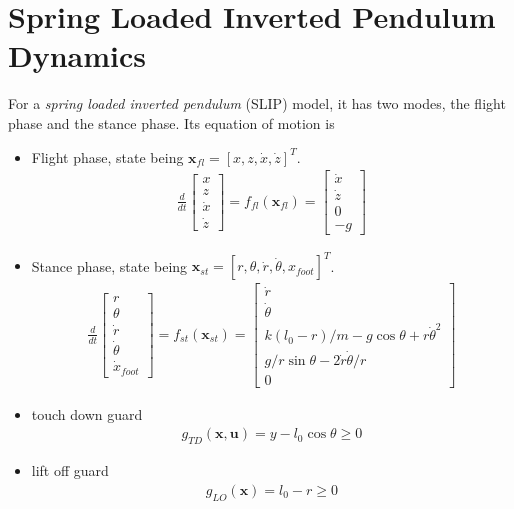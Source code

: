 \documentclass{article}
\begin{document}
\section{Spring Loaded Inverted Pendulum Dynamics}
For a \textit{spring loaded inverted pendulum} (SLIP) model, it has two modes, the flight phase and the stance phase. Its equation of motion is
\begin{itemize}
	\item Flight phase, state being $\mathbf{x}_{fl} = [x, z, \dot{x}, \dot{z}]^T$.
		\begin{align}
			\frac{d}{dt}
			\begin{bmatrix} x\\z\\\dot{x}\\\dot{z} \end{bmatrix} = f_{fl}(\mathbf{x}_{fl})
			=\begin{bmatrix}\dot{x}\\\dot{z}\\0\\-g\end{bmatrix}
		\end{align}
	\item Stance phase, state being $\mathbf{x}_{st}=[r, \theta, \dot{r}, \dot{\theta}, x_{foot}]^T$.
		\begin{align}
			\frac{d}{dt}\begin{bmatrix}r\\\theta\\\dot{r}\\\dot{\theta}\\\dot{x}_{foot}\end{bmatrix} = f_{st}(\mathbf{x}_{st})
			=\begin{bmatrix}\dot{r}\\\dot{\theta}\\k(l_0-r)/m - g\cos\theta+r\dot{\theta}^2\\g/r\sin\theta - 2\dot{r}\dot{\theta}/r\\0\end{bmatrix}
		\end{align}
	\item touch down guard
		\begin{align}
			g_{TD}(\mathbf{x}, \mathbf{u}) = y -l_0\cos\theta \ge 0
		\end{align}
	\item lift off guard
		\begin{align}
			g_{LO}(\mathbf{x}) = l_0 - r \ge 0
		\end{align}

\end{itemize}
\end{document}
